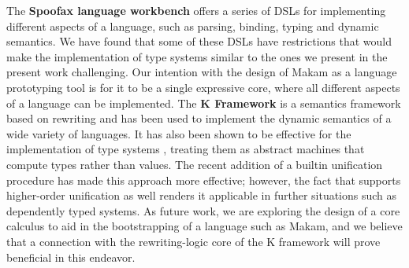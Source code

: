 The \textbf{Spoofax language workbench} \citep{spoofax-main-reference}
offers a series of DSLs for implementing different aspects of a
language, such as parsing, binding, typing and dynamic semantics. We
have found that some of these DSLs have restrictions that would make the
implementation of type systems similar to the ones we present in the
present work challenging. Our intention with the design of Makam as a
language prototyping tool is for it to be a single expressive core,
where all different aspects of a language can be implemented. The
\textbf{K Framework} \citep{k-framework-main-reference} is a semantics
framework based on rewriting and has been used to implement the dynamic
semantics of a wide variety of languages. It has also been shown to be
effective for the implementation of type systems
\citep{k-framework-type-systems}, treating them as abstract machines
that compute types rather than values. The recent addition of a builtin
unification procedure has made this approach more effective; however,
the fact that \lamprolog supports higher-order unification as well
renders it applicable in further situations such as dependently typed
systems. As future work, we are exploring the design of a core calculus
to aid in the bootstrapping of a language such as Makam, and we believe
that a connection with the rewriting-logic core of the K framework will
prove beneficial in this endeavor.
